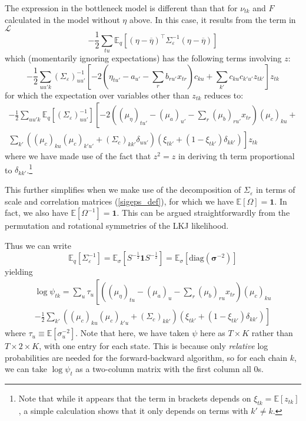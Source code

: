 \documentclass[11pt]{article}
\begin{document}
The expression in the bottleneck model is different than that for $\nu_{tk}$ and $F$ calculated in the model without $\eta$ above. In this case, it results from the term in $\mathcal{L}$
\begin{equation}
    - \frac{1}{2} \sum_{tu} \mathbb{E}_q \left[
    (\eta - \overline{\eta})^\top \Sigma_\varepsilon^{-1}(\eta - \overline{\eta}) \right]
\end{equation}
which (momentarily ignoring expectations) has the following terms involving $z$:
\begin{equation}
    -\frac{1}{2}\sum_{uu'k}\left(\Sigma_\varepsilon\right)^{-1}_{uu'} \left[-2(\eta_{tu'} - a_{u'} - \sum_r b_{ru'} x_{tr})c_{ku} + \sum_{k'}c_{ku}c_{k'u'}z_{tk'}\right]z_{tk}
\end{equation}
for which the expectation over variables other than $z_{tk}$ reduces to:
\begin{multline}
    -\frac{1}{2}\sum_{uu'k}\mathbb{E}_q\left[\left(\Sigma_\varepsilon\right)^{-1}_{uu'}\right]
    \left[-2\left((\mu_\eta)_{tu'} - (\mu_a)_{u'} - \sum_r (\mu_b)_{ru'} x_{tr}\right)
    (\mu_c)_{ku} + \right. \\
    \left.
    \sum_{k'}((\mu_c)_{ku}(\mu_c)_{k'u'} + (\Sigma_c)_{kk'}\delta_{uu'})(\xi_{tk'} + (1 - \xi_{tk'})\delta_{kk'})\right]z_{tk}
\end{multline}
where we have made use of the fact that $z^2 = z$ in deriving th term proportional to $\delta_{kk'}$.\footnote{Note that while it appears that the term in brackets depends on $\xi_{tk} = \mathbb{E}[z_{tk}]$, a simple calculation shows that it only depends on terms with $k' \neq k$.}

This further simplifies when we make use of the decomposition of $\Sigma_\varepsilon$ in terms of scale and correlation matrices (\ref{sigeps_def}), for which we have $\mathbb{E}[\Omega] = \mathbf{1}$. In fact, we also have $\mathbb{E}[\Omega^{-1}] = \mathbf{1}$. This can be argued straightforwardly from the permutation and rotational symmetries of the LKJ likelihood.

Thus we can write
\begin{equation}
    \mathbb{E}_q\left[\Sigma_\varepsilon^{-1}\right] =
    \mathbb{E}_\sigma \left[ S^{-\frac{1}{2}} \mathbf{1} S^{-\frac{1}{2}}\right]
    = \mathbb{E}_\sigma \left[\mathrm{diag}(\boldsymbol{\sigma}^{-2}) \right]
\end{equation}
yielding
\begin{multline}
    \log \psi_{tk} = \sum_u \tau_u \left[
    \left((\mu_\eta)_{tu} - (\mu_a)_{u} - \sum_r (\mu_b)_{ru} x_{tr}
    \right)
    (\mu_c)_{ku} \right .\\
    \left.
     -\frac{1}{2} \sum_{k'}((\mu_c)_{ku}(\mu_c)_{k'u} + (\Sigma_c)_{kk'})(\xi_{tk'} + (1 - \xi_{tk'})\delta_{kk'})\right]
\end{multline}
where $\tau_u \equiv \mathbb{E}[\sigma_u^{-2}]$.
Note that here, we have taken $\psi$ here as $T \times K$ rather than $T \times 2 \times K$, with one entry for each state. This is because only \emph{relative} log probabilities are needed for the forward-backward algorithm, so for each chain $k$, we can take $\log \psi_t$ as a two-column matrix with the first column all 0s.
\end{document}

